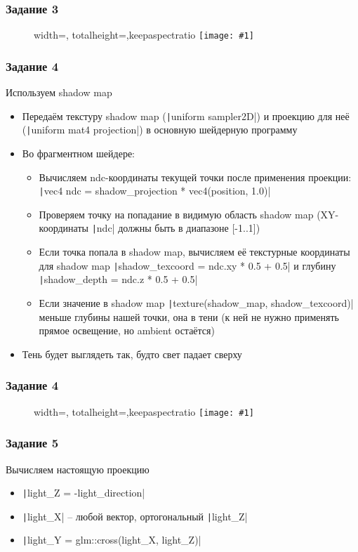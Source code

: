 \documentclass[10pt]{beamer}
\newcommand{\slideimage}[1]{
  \begin{figure}
    \begin{adjustbox}{width=\textwidth, totalheight=\textheight-2\baselineskip-2\baselineskip,keepaspectratio}
      \texttt{[image: \#1]}
    \end{adjustbox}
  \end{figure}
}
\begin{document}
\begin{frame}[fragile]
\frametitle{Задание 3}
\slideimage{3.png}
\end{frame}

\begin{frame}[fragile]
\frametitle{Задание 4}
\begin{footnotesize}
Используем shadow map
\begin{itemize}
\item Передаём текстуру shadow map (\texttt|uniform sampler2D|) и проекцию для неё (\texttt|uniform mat4 projection|) в основную шейдерную программу
\item Во фрагментном шейдере:
\begin{itemize}
\item Вычисляем ndc-координаты текущей точки после применения проекции: \texttt|vec4 ndc = shadow_projection * vec4(position, 1.0)|
\item Проверяем точку на попадание в видимую область shadow map (XY-координаты \texttt|ndc| должны быть в диапазоне [-1..1])
\item Если точка попала в shadow map, вычисляем её текстурные координаты для shadow map \texttt|shadow_texcoord = ndc.xy * 0.5 + 0.5| и глубину \texttt|shadow_depth = ndc.z * 0.5 + 0.5|
\item Если значение в shadow map \texttt|texture(shadow_map, shadow_texcoord)| меньше глубины нашей точки, она в тени (к ней не нужно применять прямое освещение, но ambient остаётся)
\end{itemize}
\item Тень будет выглядеть так, будто свет падает сверху
\end{itemize}
\end{footnotesize}
\end{frame}

\begin{frame}[fragile]
\frametitle{Задание 4}
\slideimage{4.png}
\end{frame}

\begin{frame}[fragile]
\frametitle{Задание 5}
\fontsize{10pt}{10pt}
Вычисляем настоящую проекцию
\begin{itemize}
\item \texttt|light_Z = -light_direction|
\item \texttt|light_X| -- любой вектор, ортогональный \texttt|light_Z|
\item \texttt|light_Y = glm::cross(light_X, light_Z)|
\end{itemize}
\end{frame}
\end{document}
